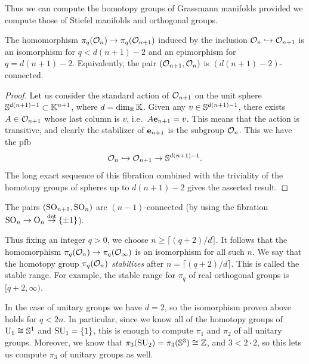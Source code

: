 Thus we can compute the homotopy groups of Grassmann manifolds provided we compute those of Stiefel manifolds and orthogonal groups. 

\begin{prop}\label{prop 10.9.6 Shastri}
    The homomorphism $\pi_q(\calO_n)\to \pi_q(\calO_{n+1})$ induced by the inclusion $\calO_n\hookrightarrow \calO_{n+1}$  is an isomorphism for $q<d(n+1)-2$ and an epimorphism for $q=d(n+1)-2$. Equivalently, the pair $(\calO_{n+1},\calO_n)$ is $(d(n+1)-2)$-connected.
\end{prop}
\begin{proof}
    Let us consider the standard action of $\calO_{n+1}$ on the unit sphere $\bbS^{d(n+1)-1}\subset \bbK^{n+1}$, where $d=\dim_\bbR\bbK$. Given any $v\in \bbS^{d(n+1)-1}$, there exists $A\in\calO_{n+1}$ whose last column is $v$, i.e.\ $ A\bf{e}_{n+1}=v$. This means that the action is transitive, and clearly the stabilizer of $\bf{e}_{n+1}$ is the subgroup $\calO_n$. This we have the \gls{pfb}
    \[\calO_n\hookrightarrow \calO_{n+1}\to \bbS^{d(n+1)-1}.\]
    The long exact sequence of this fibration combined with the triviality of the homotopy groups of spheres up to $d(n+1)-2$ gives the asserted result.
\end{proof}
\begin{cor}
    The pairs $(\SO_{n+1},\SO_n)$ are $(n-1)$-connected (by using the fibration $\SO_n\to \Or_n\overset{\det}{\to}\{\pm 1\}$).
\end{cor}
\begin{rem}
    Thus fixing an integer $q>0$, we choose $n\geq \lceil (q+2)/d\rceil$. It follows that the homomorphism $\pi_q(\calO_n)\to \pi_q(\calO_\infty)$ is an isomorphism for all such $n$. We say that the homotopy group $\pi_q(\calO_n)$ \emph{stabilizes} after $n=\lceil (q+2)/d\rceil$. This is called the stable range. For example, the stable range for $\pi_q$ of real orthogonal groups is $[q+2,\infty)$.
\end{rem}

In the case of unitary groups we have $d=2$, so the isomorphism proven above holds for $q<2n$. In particular, since we know all of the homotopy groups of $\U_1\cong \bbS^1$ and $\SU_1=\{1\}$, this is enough to compute $\pi_1$ and $\pi_2$ of all unitary groups. Moreover, we know that $\pi_3(\SU_2)=\pi_3(\bbS^3)\cong\bbZ$, and $3<2\cdot 2$, so this lets us compute $\pi_3$ of unitary groups as well. 

